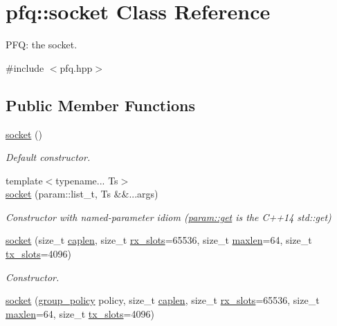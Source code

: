 \hypertarget{classpfq_1_1socket}{\section{pfq\+:\+:socket Class Reference}
\label{classpfq_1_1socket}
}


P\+F\+Q\+: the socket.  




{\ttfamily \#include $<$pfq.\+hpp$>$}

\subsection*{Public Member Functions}
\begin{DoxyCompactItemize}
\item 
\hyperlink{classpfq_1_1socket_a169a46cd01a5fd0a71919ece48f18d9d}{socket} ()
\begin{DoxyCompactList}\small\item\em Default constructor. \end{DoxyCompactList}\item 
{\footnotesize template$<$typename... Ts$>$ }\\\hyperlink{classpfq_1_1socket_aa53695f39b45a0fa9520d52a1a35d2bf}{socket} (param\+::list\+\_\+t, Ts \&\&...args)
\begin{DoxyCompactList}\small\item\em Constructor with named-\/parameter idiom (\hyperlink{namespacepfq_1_1param_a09da2abc1a228d7f77c35bed3bdb157d}{param\+::get} is the C++14 std\+::get) \end{DoxyCompactList}\item 
\hyperlink{classpfq_1_1socket_ae1799cb604036f836299a1dd5b0c2ef7}{socket} (size\+\_\+t \hyperlink{classpfq_1_1socket_ab68dbba5ef01041b9c96758c4a9f0a6c}{caplen}, size\+\_\+t \hyperlink{classpfq_1_1socket_a5cf700fc12d67b91df3d669ac4aa737a}{rx\+\_\+slots}=65536, size\+\_\+t \hyperlink{classpfq_1_1socket_a863da5015c00d6a49f1515b703c24230}{maxlen}=64, size\+\_\+t \hyperlink{classpfq_1_1socket_a019d15a072c043d6a1333ca0c836da4c}{tx\+\_\+slots}=4096)
\begin{DoxyCompactList}\small\item\em Constructor. \end{DoxyCompactList}\item 
\hyperlink{classpfq_1_1socket_a768f20e043a2244dcb0f88d03120b28a}{socket} (\hyperlink{namespacepfq_ac41249c8510558905b01fa4d866a38d7}{group\+\_\+policy} policy, size\+\_\+t \hyperlink{classpfq_1_1socket_ab68dbba5ef01041b9c96758c4a9f0a6c}{caplen}, size\+\_\+t \hyperlink{classpfq_1_1socket_a5cf700fc12d67b91df3d669ac4aa737a}{rx\+\_\+slots}=65536, size\+\_\+t \hyperlink{classpfq_1_1socket_a863da5015c00d6a49f1515b703c24230}{maxlen}=64, size\+\_\+t \hyperlink{classpfq_1_1socket_a019d15a072c043d6a1333ca0c836da4c}{tx\+\_\+slots}=4096)

\end{DoxyCompactItemize}
